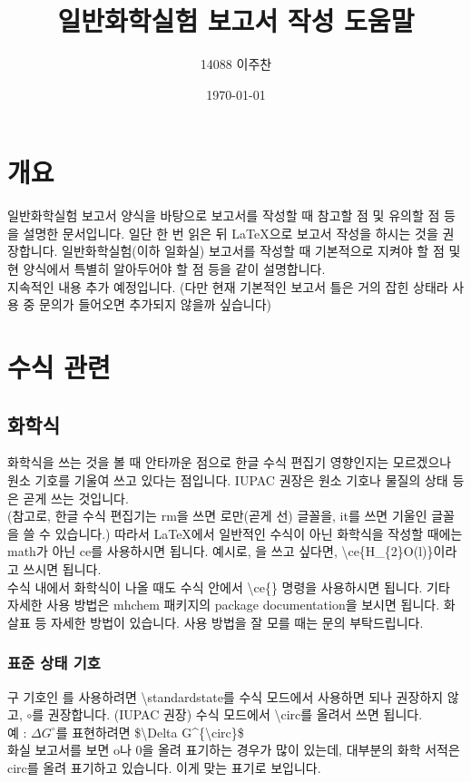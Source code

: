 \documentclass[a4paper,10pt]{article}
\begin{document}
	\title{일반화학실험 보고서 작성 도움말}	
	\author{14088 이주찬}
	\date{\today}
	\maketitle
	\tableofcontents
	\section{개요}
	일반화학실험 보고서 양식을 바탕으로 보고서를 작성할 때 참고할 점
	및 유의할 점 등을 설명한 문서입니다. 일단 한 번 읽은 뒤
	\LaTeX 으로 보고서 작성을 하시는 것을 권장합니다.
	일반화학실험(이하 일화실) 보고서를 작성할 때 기본적으로
	지켜야 할 점 및 현 양식에서 특별히 알아두어야 할 점 등을
	같이 설명합니다.\\
	지속적인 내용 추가 예정입니다. (다만 현재 기본적인 보고서 틀은 거의
	잡힌 상태라 사용 중 문의가 들어오면 추가되지 않을까 싶습니다)
	
	\section{수식 관련}
	
	\subsection{화학식}
	화학식을 쓰는 것을 볼 때 안타까운 점으로 한글 수식 편집기 영향인지는
	모르겠으나 원소 기호를 기울여 쓰고 있다는 점입니다. IUPAC 권장은
	원소 기호나 물질의 상태 등은 곧게 쓰는 것입니다. \\
	(참고로, 한글 수식 편집기는 rm을 쓰면 로만(곧게 선) 글꼴을,
	it를 쓰면 기울인 글꼴을 쓸 수 있습니다.)
	따라서 \LaTeX 에서 일반적인 수식이 아닌 화학식을 작성할 때에는
	math가 아닌 ce를 사용하시면 됩니다.
	예시로, 을 쓰고 싶다면,
	\textbackslash ce\{H\_\{2\}O(l)\}이라고 쓰시면 됩니다. \\
	수식 내에서 화학식이 나올 때도
	수식 안에서 \textbackslash ce\{\} 명령을 사용하시면 됩니다.
	기타 자세한 사용 방법은 mhchem 패키지의 package documentation을
	보시면 됩니다. 화살표 등 자세한 방법이 있습니다.
	사용 방법을 잘 모를 때는 문의 부탁드립니다.
	
	\subsubsection{표준 상태 기호}
	구 기호인 \ce{\standardstate}를 사용하려면 \textbackslash standardstate를
	수식 모드에서 사용하면 되나 권장하지 않고, $\circ$를 권장합니다.
	(IUPAC 권장)
	수식 모드에서 \textbackslash circ를 올려서 쓰면 됩니다.\\
	예 : $\Delta G^{\circ}$를 표현하려면 \$\textbackslash Delta
	G\textasciicircum\{\textbackslash circ\}\$ \\
	화실 보고서를 보면 o나 0을 올려 표기하는 경우가 많이 있는데, 대부분의 화학 서적은 circ를 올려 표기하고 있습니다. 이게 맞는 표기로 보입니다.
	
\end{document}
